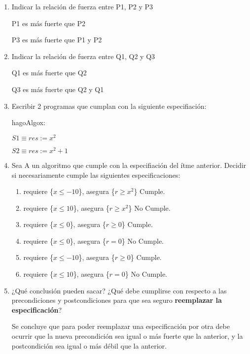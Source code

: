 \begin{enumerate}[label=\alph*)]
      \item Indicar la relación de fuerza entre P1, P2 y P3

            P1 es más fuerte que P2

            P3 es más fuerte que P1 y P2

      \item Indicar la relación de fuerza entre Q1, Q2 y Q3

            Q1 es más fuerte que Q2

            Q3 es más fuerte que Q2 y Q1

      \item Escribir 2 programas que cumplan con la siguiente especifiación:

            \begin{proc}{hagoAlgo}{\In x: \float}{\float}
            \end{proc}

            $S1 \equiv res := x^2$

            $S2 \equiv res := x^2 + 1$

      \item Sea A un algoritmo que cumple con la especifiación del ítme anterior. Decidir si necesariamente cumple las siguientes especificaciones:

            \begin{enumerate}
                  \item requiere \{$x \leq -10$\}, asegura \{$r \geq x^2$\} Cumple.
                  \item requiere \{$x \leq 10$\}, asegura \{$r \geq x^2$\} No Cumple.
                  \item requiere \{$x \leq 0$\}, asegura \{$r \geq 0$\} Cumple.
                  \item requiere \{$x \leq 0$\}, asegura \{$r = 0$\} No Cumple.
                  \item requiere \{$x \leq -10$\}, asegura \{$r \geq 0$\} Cumple.
                  \item requiere \{$x \leq 10$\}, asegura \{$r = 0$\} No Cumple.
            \end{enumerate}

      \item ¿Qué conclusión pueden sacar? ¿Qué debe cumplirse con respecto a las precondiciones y postcondiciones para que sea seguro \textbf{reemplazar la especificación}?

            Se concluye que para poder reemplazar una especificación por otra debe ocurrir que la nueva precondición sea igual o más fuerte que la anterior, y la postcondición sea igual o más débil que la anterior.
\end{enumerate}

